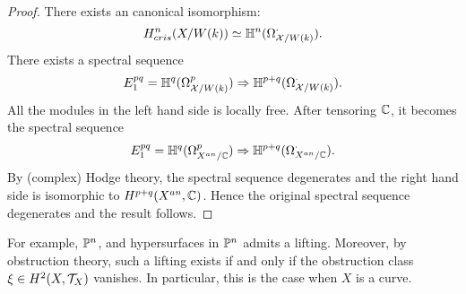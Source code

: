 \begin{proof}
    There exists an canonical isomorphism:
    \[ 
        H^n_{cris}(X/W(k)) \simeq {\mathbb {H}}^n (\Omega_{{\mathcal {X}}/W(k)}^\cdot).
    \]
    There exists a spectral sequence 
    \[
        E_1^{pq} = {\mathbb {H}}^q(\Omega_{{\mathcal {X}}/W(k)}^p) 
        \Rightarrow {\mathbb {H}}^{p+q} (\Omega_{{\mathcal {X}}/W(k)}^\cdot).
    \]
    All the modules in the left hand side is locally free. 
    After tensoring ${\mathbb {C}}$, it becomes the spectral sequence
    \[
        E_1^{pq} = {\mathbb {H}}^q(\Omega_{X^{an}/{\mathbb {C}}}^p) 
        \Rightarrow {\mathbb {H}}^{p+q} (\Omega_{X^{an}/{\mathbb {C}}}^\cdot).
    \]
    By (complex) Hodge theory, the spectral sequence degenerates 
    and the right hand side is isomorphic to $H^{p+q} (X^{an},{\mathbb {C}})$. 
    Hence the original spectral sequence degenerates and the result follows.
\end{proof}
For example, ${\mathbb {P}}^n$, and hypersurfaces in ${\mathbb {P}}^n$ admits a lifting. 
Moreover, by obstruction theory, such a lifting exists if and only if 
the obstruction class $\xi \in H^2(X, {\mathcal {T}}_X)$ vanishes. 
In particular, this is the case when $X$ is a curve. 

